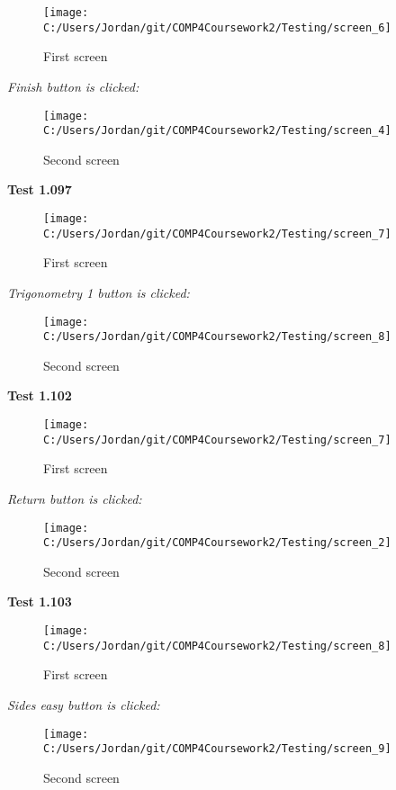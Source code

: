 \begin{figure}[H]
    \label{fig: First Screen}\caption{First screen}
    \texttt{[image: C:/Users/Jordan/git/COMP4Coursework2/Testing/screen\_6]}
\end{figure}

\textit{Finish button is clicked: }

\begin{figure}[H]
    \label{fig: Second Screen}\caption{Second screen}
    \texttt{[image: C:/Users/Jordan/git/COMP4Coursework2/Testing/screen\_4]}
\end{figure}

\textbf{Test 1.097}

\begin{figure}[H]
    \label{fig: First Screen}\caption{First screen}
    \texttt{[image: C:/Users/Jordan/git/COMP4Coursework2/Testing/screen\_7]}
\end{figure}

\textit{Trigonometry 1 button is clicked: }

\begin{figure}[H]
    \label{fig: Second Screen}\caption{Second screen}
    \texttt{[image: C:/Users/Jordan/git/COMP4Coursework2/Testing/screen\_8]}
\end{figure}

\textbf{Test 1.102}

\begin{figure}[H]
    \label{fig: First Screen}\caption{First screen}
    \texttt{[image: C:/Users/Jordan/git/COMP4Coursework2/Testing/screen\_7]}
\end{figure}

\textit{Return button is clicked: }

\begin{figure}[H]
    \label{fig: Second Screen}\caption{Second screen}
    \texttt{[image: C:/Users/Jordan/git/COMP4Coursework2/Testing/screen\_2]}
\end{figure}

\textbf{Test 1.103}

\begin{figure}[H]
    \label{fig: First Screen}\caption{First screen}
    \texttt{[image: C:/Users/Jordan/git/COMP4Coursework2/Testing/screen\_8]}
\end{figure}

\textit{Sides easy button is clicked: }

\begin{figure}[H]
    \label{fig: Second Screen}\caption{Second screen}
    \texttt{[image: C:/Users/Jordan/git/COMP4Coursework2/Testing/screen\_9]}
\end{figure}

